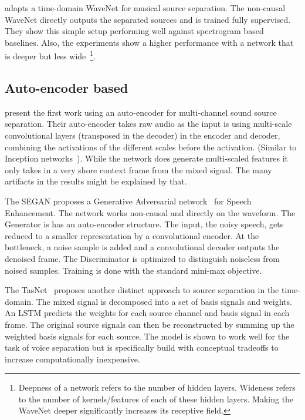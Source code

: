 \textcite{lluisEndtoend2019} adapts a time-domain WaveNet for musical source separation. The non-causal WaveNet directly outputs the separated sources and is trained fully supervised. They show this simple setup performing well against spectrogram based baselines. Also, the experiments show a higher performance with a network that is deeper but less wide~\footnote{Deepness of a network refers to the number of hidden layers. Wideness refers to the number of kernels/features of each of these hidden layers. Making the WaveNet deeper significantly increases its receptive field.}.

\subsection{Auto-encoder based}
\textcite{graisRaw2018} present the first work using an auto-encoder for multi-channel sound source separation. Their auto-encoder takes raw audio as the input is using multi-scale convolutional layers (transposed in the decoder) in the encoder and decoder, combining the activations of the different scales before the activation. (Similar to Inception networks~\cite{szegedyGoing2014}). While the network does generate multi-scaled features it only takes in a very shore context frame from the mixed signal. The many artifacts in the results might be explained by that.

The SEGAN\cite{pascualSEGAN2017} proposes a Generative Adversarial network~\cite{goodfellowGenerative2014} for Speech Enhancement. The network works non-causal and directly on the waveform. The Generator is has an auto-encoder structure. The input, the noisy speech, gets reduced to a smaller representation by a convolutional encoder. At the bottleneck, a noise sample is added and a convolutional decoder outputs the denoised frame. The Discriminator is optimized to distinguish noiseless from noised samples. Training is done with the standard mini-max objective.

The TasNet~\cite{luoTasNet2018} proposes another distinct approach to source separation in the time-domain. The mixed signal is decomposed into a set of basis signals and weights. An LSTM predicts the weights for each source channel and basis signal in each frame. The original source signals can then be reconstructed by summing up the weighted basis signals for each source. The model is shown to work well for the task of voice separation but is specifically build with conceptual tradeoffs to increase computationally inexpensive.
